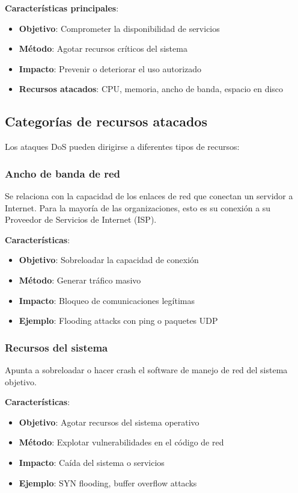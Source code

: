 \textbf{Características principales}:
\begin{itemize}
    \item \textbf{Objetivo}: Comprometer la disponibilidad de servicios
    \item \textbf{Método}: Agotar recursos críticos del sistema
    \item \textbf{Impacto}: Prevenir o deteriorar el uso autorizado
    \item \textbf{Recursos atacados}: CPU, memoria, ancho de banda, espacio en disco
\end{itemize}

\subsection{Categorías de recursos atacados}

Los ataques DoS pueden dirigirse a diferentes tipos de recursos:

\subsubsection{Ancho de banda de red}

Se relaciona con la capacidad de los enlaces de red que conectan un servidor a Internet. Para la mayoría de las organizaciones, esto es su conexión a su Proveedor de Servicios de Internet (ISP).

\textbf{Características}:
\begin{itemize}
    \item \textbf{Objetivo}: Sobreloadar la capacidad de conexión
    \item \textbf{Método}: Generar tráfico masivo
    \item \textbf{Impacto}: Bloqueo de comunicaciones legítimas
    \item \textbf{Ejemplo}: Flooding attacks con ping o paquetes UDP
\end{itemize}

\subsubsection{Recursos del sistema}

Apunta a sobreloadar o hacer crash el software de manejo de red del sistema objetivo.

\textbf{Características}:
\begin{itemize}
    \item \textbf{Objetivo}: Agotar recursos del sistema operativo
    \item \textbf{Método}: Explotar vulnerabilidades en el código de red
    \item \textbf{Impacto}: Caída del sistema o servicios
    \item \textbf{Ejemplo}: SYN flooding, buffer overflow attacks
\end{itemize}

